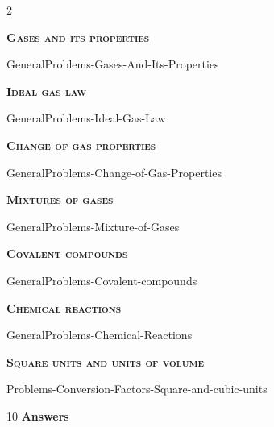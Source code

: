 \documentclass[main.tex]{subfiles}
\begin{document}
\newpage
\fancyhfoffset[E,O]{0pt}
\setlength{\columnsep}{30pt}
\begin{conclusion}
\end{conclusion}
\begin{multicols*}{2}\setcounter{numA}{1}  %













\newcommand\chapterlabel{Ch-Gas}
{\raggedright\textsc{\textbf{Gases and its properties}}\par}
 {GeneralProblems-Gases-And-Its-Properties}
 {\raggedright\textsc{\textbf{Ideal gas law}}\par}
 {GeneralProblems-Ideal-Gas-Law}
 {\raggedright\textsc{\textbf{Change of gas properties}}\par}
  {GeneralProblems-Change-of-Gas-Properties}
   {\raggedright\textsc{\textbf{Mixtures of gases}}\par}
 {GeneralProblems-Mixture-of-Gases}
 
 
 {\raggedright\textsc{\textbf{Covalent compounds}}\par}
  \renewcommand\chapterlabel{Ch-naming}
 {GeneralProblems-Covalent-compounds}


 
 
{\raggedright\textsc{\textbf{Chemical reactions}}\par}\renewcommand\chapterlabel{Ch-mole}
{GeneralProblems-Chemical-Reactions}
{\raggedright\textsc{\textbf{Square units and units of volume}}\par}\renewcommand\chapterlabel{Ch-measurements}
{Problems-Conversion-Factors-Square-and-cubic-units}

 
 

\end{multicols*}
\newpage
\begin{answersenvironment}
\begin{minipage}[c]{1\textwidth}
\begin{localsize}{10}
{\Large \bf Answers}
\end{localsize}
\end{minipage}\end{answersenvironment}
\end{document}
